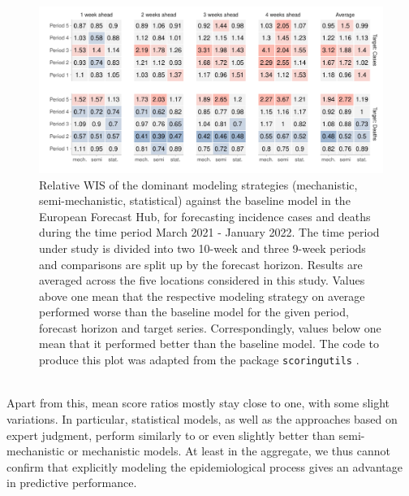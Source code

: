 \begin{figure}
\centering
\includegraphics[width = \textwidth]{../plots/pw_comp_model_types_across_periods_wide.pdf}
\caption{Relative WIS of the dominant modeling strategies (mechanistic, semi-mechanistic, statistical) against the baseline model in the European Forecast Hub, for forecasting incidence cases and deaths during the time period March 2021 - January 2022. The time period under study is divided into two 10-week and three 9-week periods and comparisons are split up by the forecast horizon.  Results are averaged across the five locations considered in this study. Values above one mean that the respective modeling strategy on average performed worse than the baseline model for the given period, forecast horizon and target series. Correspondingly, values below one mean that it performed better than the baseline model. The code to produce this plot was adapted from the package \texttt{scoringutils} \citep{bosse_evaluating_2022}.}
\label{fig:pw_comp_modeltypes_byperiod}
\end{figure}\\
Apart from this, mean score ratios mostly stay close to one, with some slight variations. In particular, statistical models, as well as the approaches based on expert judgment, perform similarly to or even slightly better than semi-mechanistic or mechanistic models. At least in the aggregate, we thus cannot confirm that explicitly modeling the epidemiological process gives an advantage in predictive performance.%
